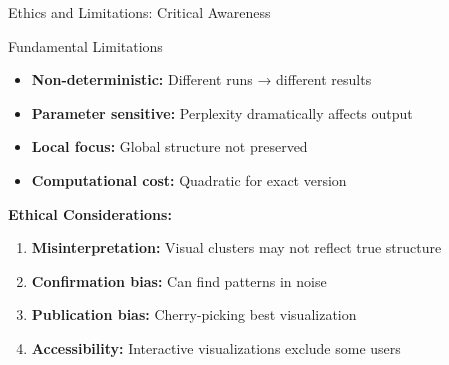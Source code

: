 \begin{frame}{Ethics and Limitations: Critical Awareness}
\begin{block}{Fundamental Limitations}
\begin{itemize}
\item \textbf{Non-deterministic:} Different runs → different results
\item \textbf{Parameter sensitive:} Perplexity dramatically affects output
\item \textbf{Local focus:} Global structure not preserved
\item \textbf{Computational cost:} Quadratic for exact version
\end{itemize}
\end{block}

\textbf{Ethical Considerations:}
\begin{enumerate}
\item \textbf{Misinterpretation:} Visual clusters may not reflect true structure
\item \textbf{Confirmation bias:} Can find patterns in noise
\item \textbf{Publication bias:} Cherry-picking best visualization
\item \textbf{Accessibility:} Interactive visualizations exclude some users
\end{enumerate}

\end{frame}

